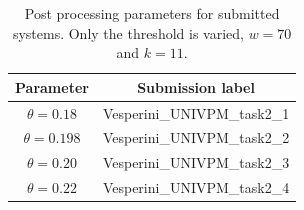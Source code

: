 \documentclass{article}
\begin{document}
\begin{sloppy}
\begin{table}[t]
  \caption{Post processing parameters for submitted systems. Only the threshold is varied, $w = 70$ and $k=11$.}
  \label{tbl:submitted-params}
  \centering
  \footnotesize
  \begin{tabular} {| c | c |}
    \hline
    Parameter     & Submission label\\  
    \hline
    \hline                                     
    $\theta=0.18$ & Vesperini\_UNIVPM\_task2\_1 \\
    \hline                                     
    $\theta=0.198$ & Vesperini\_UNIVPM\_task2\_2 \\
    \hline
    $\theta=0.20$ & Vesperini\_UNIVPM\_task2\_3 \\
    \hline   
    $\theta=0.22$ & Vesperini\_UNIVPM\_task2\_4 \\
    \hline                                       
  \end{tabular}
\end{table}




\end{sloppy}
\end{document}
